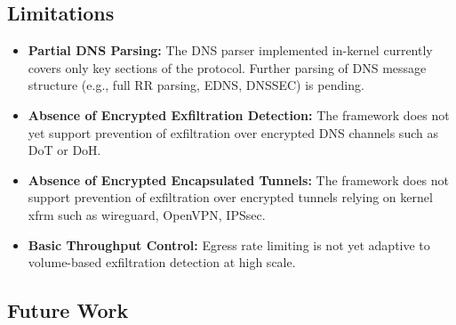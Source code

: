 \documentclass [11pt, proquest] {uwthesis}[2020/02/24]
\begin{document}
\subsection*{Limitations}

\begin{itemize}[itemsep=1pt,parsep=0pt]
  
  \item \textbf{Partial DNS Parsing:} The DNS parser implemented in-kernel currently covers only key sections of the protocol. Further parsing of DNS message structure (e.g., full RR parsing, EDNS, DNSSEC) is pending.

  \item \textbf{Absence of Encrypted Exfiltration Detection:} The framework does not yet support prevention of exfiltration over encrypted DNS channels such as DoT or DoH.

  \item \textbf{Absence of Encrypted Encapsulated Tunnels:} The framework does not support prevention of exfiltration over encrypted tunnels relying on kernel xfrm such as wireguard, OpenVPN, IPSsec. 


  \item \textbf{Basic Throughput Control:} Egress rate limiting is not yet adaptive to volume-based exfiltration detection at high scale.
\end{itemize}

\subsection*{Future Work}
\end{document}
